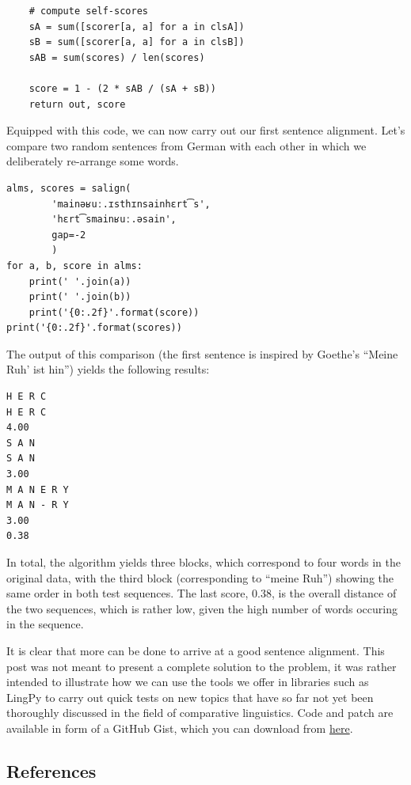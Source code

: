 \documentclass[
  a4paper,
  14pt,
  oneside,
  tablecaptionabove
]{scrbook}
\begin{document}
\begin{lstlisting}
    # compute self-scores
    sA = sum([scorer[a, a] for a in clsA])
    sB = sum([scorer[a, a] for a in clsB])
    sAB = sum(scores) / len(scores)

    score = 1 - (2 * sAB / (sA + sB))
    return out, score
\end{lstlisting}

Equipped with this code, we can now carry out our first sentence
alignment. Let's compare two random sentences from German with each
other in which we deliberately re-arrange some words.

\begin{lstlisting}
alms, scores = salign(
        'mainəʁuː.ɪsthɪnsainhɛrt͡s',
        'hɛrt͡smainʁuː.əsain',
        gap=-2
        )
for a, b, score in alms:
    print(' '.join(a))
    print(' '.join(b))
    print('{0:.2f}'.format(score))
print('{0:.2f}'.format(scores))
\end{lstlisting}

The output of this comparison (the first sentence is inspired by
Goethe's \enquote{Meine Ruh' ist hin}) yields the following results:

\begin{lstlisting}
H E R C
H E R C
4.00
S A N
S A N
3.00
M A N E R Y
M A N - R Y
3.00
0.38
\end{lstlisting}

In total, the algorithm yields three blocks, which correspond to four
words in the original data, with the third block (corresponding to
\enquote{meine Ruh}) showing the same order in both test sequences. The
last score, 0.38, is the overall distance of the two sequences, which is
rather low, given the high number of words occuring in the sequence.

It is clear that more can be done to arrive at a good sentence
alignment. This post was not meant to present a complete solution to the
problem, it was rather intended to illustrate how we can use the tools
we offer in libraries such as LingPy to carry out quick tests on new
topics that have so far not yet been thoroughly discussed in the field
of comparative linguistics. Code and patch are available in form of a
GitHub Gist, which you can download from
\href{https://gist.github.com/LinguList/8189f06f231909fbf1d1eed30998bd83}{here}.

\subsection*{References}
\end{document}
